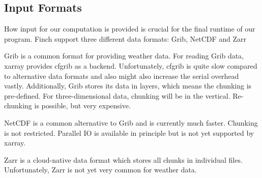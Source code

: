 \subsection{Input Formats}

How input for our computation is provided is crucial for the final runtime of our program.
Finch support three different data formats: Grib, NetCDF and Zarr

Grib is a common format for providing weather data.
For reading Grib data, xarray provides cfgrib \cite{cfgrib2022} as a backend.
Unfortunately, cfgrib is quite slow compared to alternative data formats and also might also increase the serial overhead vastly.
Additionally, Grib stores its data in layers, which means the chunking is pre-defined.
For three-dimensional data, chunking will be in the vertical.
Re-chunking is possible, but very expensive.

NetCDF is a common alternative to Grib and is currently much faster.
Chunking is not restricted.
Parallel IO is available in principle but is not yet supported by xarray.

Zarr is a cloud-native data format which stores all chunks in individual files.
Unfortunately, Zarr is not yet very common for weather data.